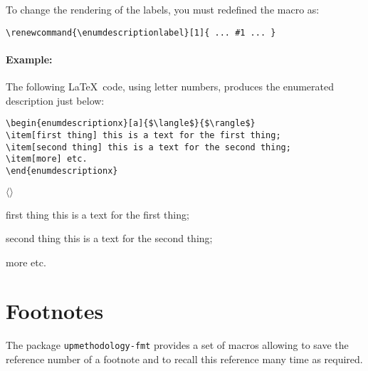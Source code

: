 \documentclass[book,taskpackage,specpackage,codepackage]{upmethodology-document}
\begin{document}
To change the rendering of the labels, you must redefined the macro as:
\begin{verbatim}
\renewcommand{\enumdescriptionlabel}[1]{ ... #1 ... }
\end{verbatim}


\paragraph{Example:} The following \LaTeX~code, using letter numbers, produces the enumerated description just below:
\begin{verbatim}
\begin{enumdescriptionx}[a]{$\langle$}{$\rangle$}
\item[first thing] this is a text for the first thing;
\item[second thing] this is a text for the second thing;
\item[more] etc.
\end{enumdescriptionx}
\end{verbatim}

\begin{enumdescriptionx}[a]{$\langle$}{$\rangle$}
\item[first thing] this is a text for the first thing;
\item[second thing] this is a text for the second thing;
\item[more] etc.
\end{enumdescriptionx}


\section{Footnotes}

The package \texttt{upmethodology-fmt} provides a set of macros allowing to save the reference number of a footnote and to recall this reference many time as required.
\end{document}
